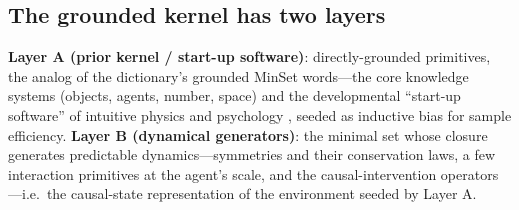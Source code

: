 \documentclass[10pt,twocolumn]{article}
\begin{document}
\subsection{The grounded kernel has two layers}
\textbf{Layer A (prior kernel / start-up software)}: directly-grounded primitives,
the analog of the dictionary's grounded MinSet words---the core knowledge systems
(objects, agents, number, space) \citep{spelke2007core} and the developmental
``start-up software'' of intuitive physics and psychology
\citep{lake2017building}, seeded as inductive bias for sample efficiency.
\textbf{Layer B (dynamical generators)}: the minimal set whose closure generates
predictable dynamics---symmetries and their conservation laws, a few
interaction primitives at the agent's scale, and the causal-intervention
operators---i.e.\ the causal-state representation of the environment seeded by
Layer A.
\end{document}
